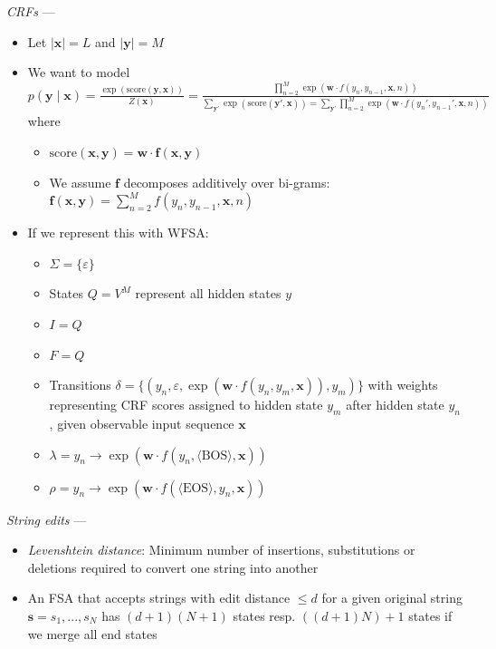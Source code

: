 \emph{CRFs} --- 
\begin{itemize}
    \item Let $|\boldsymbol{x}| = L$ and $|\boldsymbol{y}| = M$
    \item We want to model 
    $
    p(\boldsymbol{y} \mid \boldsymbol{x}) = \frac{\exp(\textrm{score}(\boldsymbol{y}, \boldsymbol{x}))}{Z(\boldsymbol{x})} = \frac{\prod_{n=2}^M \exp(\boldsymbol{w} \cdot f(y_n, y_{n-1}, \boldsymbol{x}, n))}{\sum_{\boldsymbol{y}'} \exp(\textrm{score}(\boldsymbol{y}', \boldsymbol{x})) = \sum_{\boldsymbol{y}'} \prod_{n=2}^M \exp(\boldsymbol{w} \cdot f(y_n', y_{n-1}', \boldsymbol{x}, n))}
    $
    where
    \begin{itemize}
        \item $
        \textrm{score}(\boldsymbol{x}, \boldsymbol{y}) = \boldsymbol{w} \cdot \boldsymbol{f}(\boldsymbol{x}, \boldsymbol{y})
        $
        \item We assume $\boldsymbol{f}$ decomposes additively over bi-grams:
        $
        \boldsymbol{f}(\boldsymbol{x}, \boldsymbol{y}) = \sum_{n=2}^M f(y_n, y_{n-1}, \boldsymbol{x}, n)
        $
    \end{itemize}
    \item If we represent this with WFSA:
    \begin{itemize}
        \item $\Sigma = \{\varepsilon\}$
        \item States $Q = V^M$ represent all hidden states $y$
        \item $I = Q$
        \item $F = Q$
        \item Transitions $\delta = \{(y_n, \varepsilon, \exp(\boldsymbol{w} \cdot f(y_n, y_{m}, \boldsymbol{x})), y_m) \}$ with weights representing CRF scores assigned to hidden state $y_m$ after hidden state $y_n$, given observable input sequence $\boldsymbol{x}$
        \item $\lambda = y_n \to \exp(\boldsymbol{w} \cdot f(y_n, \langle \textrm{BOS} \rangle, \boldsymbol{x}))$
        \item $\rho = y_n \to \exp(\boldsymbol{w} \cdot f(\langle \textrm{EOS} \rangle, y_n, \boldsymbol{x}))$
    \end{itemize}
\end{itemize}

\emph{String edits} --- 
\begin{itemize}
    \item \emph{Levenshtein distance}: Minimum number of insertions, substitutions or deletions required to convert one string into another
    \item An FSA that accepts strings with edit distance $\leq d$ for a given original string $\boldsymbol{s} = s_1, ..., s_N$ has $(d+1)(N+1)$ states resp. $((d+1)N)+1$ states if we merge all end states
\end{itemize}

